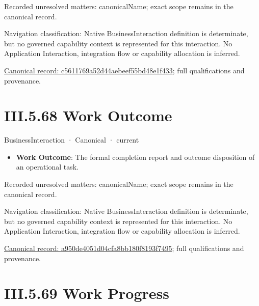 {\small Recorded unresolved matters: canonicalName; exact scope remains in the canonical record.}\par
{\small Navigation classification: Native BusinessInteraction definition is determinate, but no governed capability context is represented for this interaction. No Application Interaction, integration flow or capability allocation is inferred.}\par
{\footnotesize \href{../../../../../../../continuum/business/business-interaction/c5611769a52d44aebeef55bd48e1f433.md}{Canonical record: c5611769a52d44aebeef55bd48e1f433}; full qualifications and provenance.}\par
\section*{III.5.68 Work Outcome}
\label{navigation:III.5.68}

\label{element:a950de4051d04cfa8bb180f8193f7495}
{\small BusinessInteraction · Canonical · current}\par

\begin{itemize}


\item \textbf{Work Outcome}: The formal completion report and outcome disposition of an operational task.

\end{itemize}

{\small Recorded unresolved matters: canonicalName; exact scope remains in the canonical record.}\par
{\small Navigation classification: Native BusinessInteraction definition is determinate, but no governed capability context is represented for this interaction. No Application Interaction, integration flow or capability allocation is inferred.}\par
{\footnotesize \href{../../../../../../../continuum/business/business-interaction/a950de4051d04cfa8bb180f8193f7495.md}{Canonical record: a950de4051d04cfa8bb180f8193f7495}; full qualifications and provenance.}\par
\section*{III.5.69 Work Progress}
\label{navigation:III.5.69}

